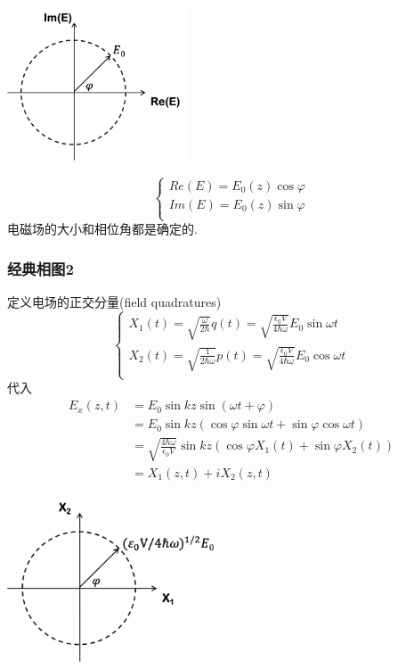 \begin{frame}
   \begin{center}
      \includegraphics[width=0.4\textwidth]{figs/2.png}
   \end{center}
 \[ \begin{cases}
  Re(E)= E_{0}(z) \cos\varphi\\ 
  Im(E)= E_{0}(z) \sin\varphi\\ 
 \end{cases} \]
 电磁场的大小和相位角都是确定的.  
\end{frame}

\begin{frame}
  \frametitle{经典相图2}
  定义电场的正交分量(field quadratures)
  \[ \begin{cases}
    X_{1}(t) = \sqrt{\frac{\omega}{2\hbar}}q(t)= \sqrt{\frac{\epsilon_{0} V}{4 \hbar \omega}} {E}_{0} \sin \omega t\\ 
    X_{2}(t) = \sqrt{\frac{1}{2\hbar \omega}}p(t)= \sqrt{\frac{\epsilon_{0} V}{4 \hbar \omega}} {E}_{0} \cos \omega t\\ 
   \end{cases} \]
   代入
   \[
  \begin{aligned}
       E_{x}(z, t) &=E_{0} \sin k z \sin (\omega t + \varphi) \\
       &=  E_{0} \sin k z (\cos\varphi \sin\omega t + \sin\varphi \cos\omega t) \\ 
       &= \sqrt{\frac{4 \hbar \omega}{\epsilon_{0} V}} \sin k z\left(\cos \varphi X_{1}(t)+\sin \varphi X_{2}(t)\right) \\ 
       &=  X_{1}(z,t)+ i X_{2}(z,t)
  \end{aligned}
  \]
\end{frame}

\begin{frame}
  \begin{center}
     \includegraphics[width=0.5\textwidth]{figs/3.png}
  \end{center}
\end{frame}


